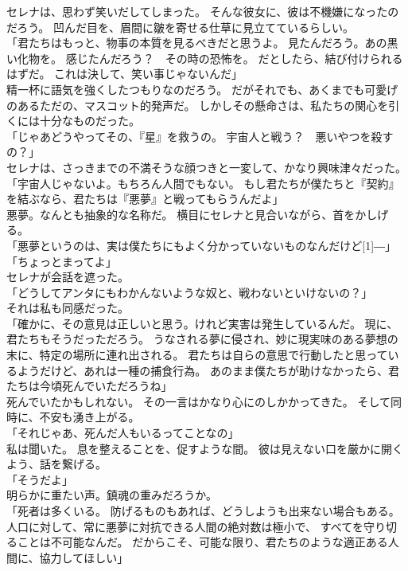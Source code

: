 \documentclass[../IHMain]{subfiles}
\begin{document}
セレナは、思わず笑いだしてしまった。
そんな彼女に、彼は不機嫌になったのだろう。
凹んだ目を、眉間に皺を寄せる仕草に見立てているらしい。\\
「君たちはもっと、物事の本質を見るべきだと思うよ。
見たんだろう。あの黒い化物を。
感じたんだろう？　その時の恐怖を。
だとしたら、結び付けられるはずだ。
これは決して、笑い事じゃないんだ」\\
精一杯に語気を強くしたつもりなのだろう。
だがそれでも、あくまでも可愛げのあるただの、マスコット的発声だ。
しかしその懸命さは、私たちの関心を引くには十分なものだった。\\
「じゃあどうやってその、『星』を救うの。
宇宙人と戦う？　悪いやつを殺すの？」\\
セレナは、さっきまでの不満そうな顔つきと一変して、かなり興味津々だった。\\
「宇宙人じゃないよ。もちろん人間でもない。
もし君たちが僕たちと『契約』を結ぶなら、君たちは『悪夢』と戦ってもらうんだよ」\\
悪夢。なんとも抽象的な名称だ。
横目にセレナと見合いながら、首をかしげる。\\
「悪夢というのは、実は僕たちにもよく分かっていないものなんだけど\scalebox{3}[1]{―}」\\
「ちょっとまってよ」\\
セレナが会話を遮った。\\
「どうしてアンタにもわかんないような奴と、戦わないといけないの？」\\
それは私も同感だった。\\
「確かに、その意見は正しいと思う。けれど実害は発生しているんだ。
現に、君たちもそうだっただろう。
うなされる夢に侵され、妙に現実味のある夢想の末に、特定の場所に連れ出される。
君たちは自らの意思で行動したと思っているようだけど、あれは一種の捕食行為。
あのまま僕たちが助けなかったら、君たちは今頃死んでいただろうね」\\
死んでいたかもしれない。
その一言はかなり心にのしかかってきた。
そして同時に、不安も湧き上がる。\\
「それじゃあ、死んだ人もいるってことなの」\\
私は聞いた。
息を整えることを、促すような間。
彼は見えない口を厳かに開くよう、話を繋げる。\\
「そうだよ」\\
明らかに重たい声。鎮魂の重みだろうか。\\
「死者は多くいる。
防げるものもあれば、どうしようも出来ない場合もある。
人口に対して、常に悪夢に対抗できる人間の絶対数は極小で、
すべてを守り切ることは不可能なんだ。
だからこそ、可能な限り、君たちのような適正ある人間に、協力してほしい」\\
\end{document}
